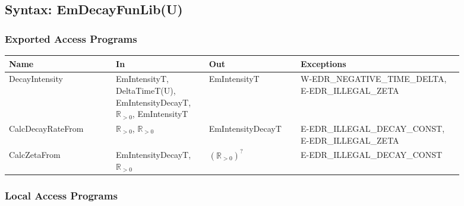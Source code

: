 \clearpage\subsection{Syntax: EmDecayFunLib(U)}

\subsubsection{Exported Access Programs}

\begin{center}
    \renewcommand{\arraystretch}{1.2}
    \small
    \begin{tabular}{m{0.21\linewidth} m{0.18\linewidth} m{0.18\linewidth}
            m{0.32\linewidth}}
        \toprule
        \textbf{Name} & \textbf{In} & \textbf{Out} & \textbf{Exceptions} \\
        \midrule

        \rowcolor[gray]{0.9}DecayIntensity & EmIntensityT, \newline
        DeltaTimeT(U), \newline EmIntensityDecayT, \newline $\mathbb{R}_{>0}$,
        EmIntensityT & EmIntensityT & W-EDR\_NEGATIVE\_TIME\_DELTA, \newline
        E-EDR\_ILLEGAL\_ZETA \\

        CalcDecayRateFrom & $\mathbb{R}_{>0}$, $\mathbb{R}_{>0}$ &
        EmIntensityDecayT & E-EDR\_ILLEGAL\_DECAY\_CONST, \newline
        E-EDR\_ILLEGAL\_ZETA \\

        \rowcolor[gray]{0.9}CalcZetaFrom & EmIntensityDecayT, \newline
        $\mathbb{R}_{>0}$ & $(\mathbb{R}_{>0})^?$ &
        E-EDR\_ILLEGAL\_DECAY\_CONST \\

        \bottomrule
    \end{tabular}
\end{center}

\subsubsection{Local Access Programs}

